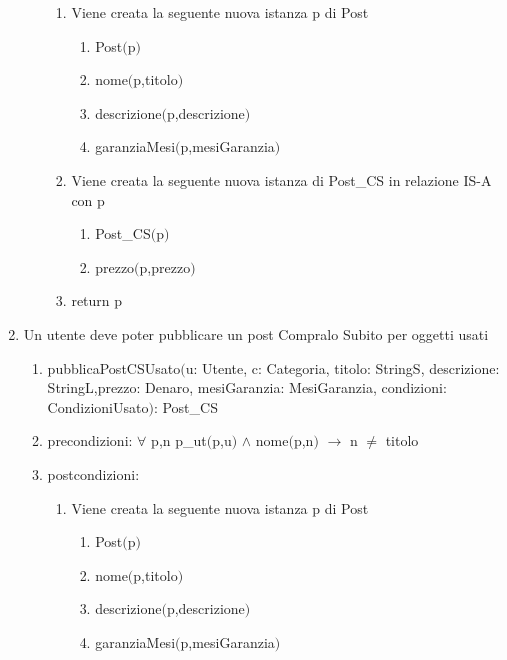 \documentclass{article}
\begin{document}
\begin{enumerate}
\begin{enumerate}
        \begin{enumerate}
            \item Viene creata la seguente nuova istanza p di Post
            \begin{enumerate}
                \item Post$($p$)$
                \item nome$($p,titolo$)$
                \item descrizione$($p,descrizione$)$
                \item garanziaMesi$($p,mesiGaranzia$)$
            \end{enumerate}
            \item Viene creata la seguente nuova istanza di Post\_CS in relazione IS-A con p
            \begin{enumerate}
                \item Post\_CS$($p$)$
                \item prezzo$($p,prezzo$)$
            \end{enumerate}
            \item return p
        \end{enumerate}
    \end{enumerate}
    \newpage
    \item\label{sec:pubblicaPostCSUsato} Un utente deve poter pubblicare un post Compralo Subito per oggetti usati
    \begin{enumerate}
        \item pubblicaPostCSUsato$($u: Utente, c: Categoria, titolo: StringS, descrizione: StringL,\newline prezzo: Denaro, mesiGaranzia: MesiGaranzia, condizioni: CondizioniUsato$)$: Post\_CS
        \item precondizioni: $\forall$ p,n p\_ut$($p,u$)$ $\land$ nome$($p,n$)$ $\rightarrow$ n $\neq$ titolo
        \item postcondizioni:
        \begin{enumerate}
            \item Viene creata la seguente nuova istanza p di Post
            \begin{enumerate}
                \item Post$($p$)$
                \item nome$($p,titolo$)$
                \item descrizione$($p,descrizione$)$
                \item garanziaMesi$($p,mesiGaranzia$)$
            \end{enumerate}

\end{enumerate}
\end{enumerate}
\end{enumerate}
\end{document}
